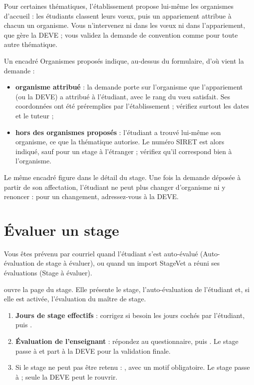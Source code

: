 \documentclass[11pt,a4paper]{article}
\begin{document}
Pour certaines thématiques, l'établissement propose lui-même les organismes
d'accueil : les étudiants classent leurs vœux, puis un appariement attribue à
chacun un organisme. Vous n'intervenez ni dans les vœux ni dans l'appariement,
que gère la DEVE ; vous validez la demande de convention comme pour toute autre
thématique.

Un encadré \og Organismes proposés\fg{} indique, au-dessus du formulaire, d'où
vient la demande :

\begin{itemize}
  \item \textbf{organisme attribué} : la demande porte sur l'organisme que
        l'appariement (ou la DEVE) a attribué à l'étudiant, avec le rang du vœu
        satisfait. Ses coordonnées ont été préremplies par l'établissement ;
        vérifiez surtout les dates et le tuteur ;
  \item \textbf{hors des organismes proposés} : l'étudiant a trouvé lui-même son
        organisme, ce que la thématique autorise. Le numéro SIRET est alors
        indiqué, sauf pour un stage à l'étranger ; vérifiez qu'il correspond bien
        à l'organisme.
\end{itemize}


Le même encadré figure dans le détail du stage. Une fois la demande déposée à
partir de son affectation, l'étudiant ne peut plus changer d'organisme ni y
renoncer : pour un changement, adressez-vous à la DEVE.

\section{Évaluer un stage}

Vous êtes prévenu par courriel quand l'étudiant s'est auto-évalué
(\og Auto-évaluation de stage à évaluer\fg{}), ou quand un import StageVet a
réuni ses évaluations (\og Stage à évaluer\fg{}).

 ouvre la page du stage. Elle présente le stage,
l'auto-évaluation de l'étudiant et, si elle est activée, l'évaluation du maître
de stage.


\begin{enumerate}
  \item \textbf{Jours de stage effectifs} : corrigez si besoin les jours
        cochés par l'étudiant, puis .
  \item \textbf{Évaluation de l'enseignant} : répondez au questionnaire, puis
        . Le stage passe à  et
        part à la DEVE pour la validation finale.
  \item Si le stage ne peut pas être retenu : , avec
        un motif obligatoire. Le stage passe à  ; seule la
        DEVE peut le rouvrir.
\end{enumerate}
\end{document}
